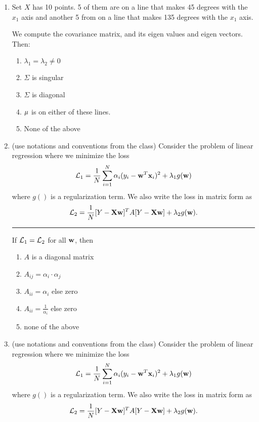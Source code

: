 \documentclass{article}
\begin{document}
\begin{enumerate}
   \item Set $X$ has 10 points. 5 of them are on a line that makes 45 degrees with the $x_1$ axis and another 5 from on a line that makes 135 degrees with the $x_1$ axis.

    We compute the covariance matrix, and its eigen values and eigen vectors. Then:

    \begin{enumerate}
        \item $\lambda_1 = \lambda_2 \neq 0$
        \item $\Sigma$ is singular
        \item $\Sigma$ is diagonal
        \item ${\bf \mu}$ is on either of these lines.
        \item None of the above
    \end{enumerate}



    \item (use notations  and conventions from the class) Consider the problem of linear regression where we
    minimize the loss
    \[{\cal L}_1 = \frac{1}{N}\sum_{i=1}^N \alpha_i (y_i - {\bf w}^T{\bf x}_i)^2 + \lambda_1 g({\bf w})\] where $g()$ is a regularization term. We also write the loss in matrix form as \[ {\cal L}_2 = \frac{1}{N} [Y-{\bf X}{\bf w}]^TA[Y-{\bf X}{\bf w}] + \lambda_2 g({\bf w}). \]

    \hrule
    If ${\cal L}_1 = {\cal L}_2$ for all $\bf{w}$, then
    \begin{enumerate}
        \item $A$ is a diagonal matrix
        \item $A_{ij} = \alpha_i \cdot \alpha_j $
        \item $A_{ii} = \alpha_i$ else zero
        \item $A_{ii} = \frac{1}{\alpha_i}$ else zero
        \item none of the above
    \end{enumerate}

      \item (use notations  and conventions from the class) Consider the problem of linear regression where we
    minimize the loss
    \[{\cal L}_1 = \frac{1}{N}\sum_{i=1}^N \alpha_i (y_i - {\bf w}^T{\bf x}_i)^2 + \lambda_1 g({\bf w})\] where $g()$ is a regularization term. We also write the loss in matrix form as \[ {\cal L}_2 = \frac{1}{N} [Y-{\bf X}{\bf w}]^TA[Y-{\bf X}{\bf w}] + \lambda_2 g({\bf w}). \]


\end{enumerate}
\end{document}
